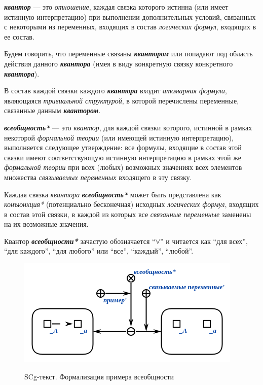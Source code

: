 \begin{SCn}
\end{SCn}

\textbf{\textit{квантор}} — это \textit{отношение}, каждая связка которого истинна (или имеет истинную интерпретацию) при выполнении дополнительных условий, связанных с некоторыми из переменных, входящих в состав \textit{логических формул}, входящих в ее состав.

Будем говорить, что переменные связаны \textbf{\textit{квантором}} или попадают под область действия данного \textbf{\textit{квантора}} (имея в виду конкретную связку конкретного \textbf{\textit{квантора}}).

В состав каждой связки каждого \textbf{\textit{квантора}} входит \textit{атомарная формула}, являющаяся \textit{тривиальной структурой}, в которой перечислены переменные, связанные данным \textbf{\textit{квантором}}.

\begin{SCn}
\end{SCn}

\textbf{\textit{всеобщность*}} --- это \textit{квантор}, для каждой связки которого, истинной в рамках некоторой \textit{формальной теории} (или имеющей истинную интерпретацию), выполняется следующее утверждение: все формулы, входящие в состав этой связки имеют соответствующую истинную интерпретацию в рамках этой же \textit{формальной теории} при всех (любых) возможных значениях всех элементов множества \textit{связываемых переменных\scnrolesign} входящего в эту связку.

Каждая связка \textit{квантора} \textbf{\textit{всеобщность*}} может быть представлена как \textit{конъюнкция*} (потенциально бесконечная) исходных \textit{логических формул}, входящих в состав этой связки, в каждой из которых все \textit{связанные переменные\scnrolesign} заменены на их возможные значения.

Квантор \textbf{\textit{всеобщности*}} зачастую обозначается ``$\forall$'' и читается как ``для всех'', ``для каждого'', ``для любого'' или ``все'', ``каждый'', ``любой''.

\begin{figure}[H]
\caption{SCg-текст. Формализация примера всеобщности}
\includegraphics[scale=0.8]{author/part2/figures/logic/universality.png}
\label{fig:universality}
\end{figure}

